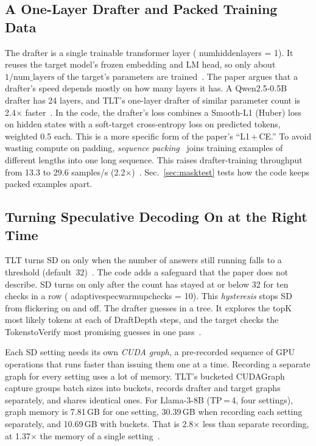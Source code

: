 \documentclass[conference]{IEEEtran}
\newcommand{\brkus}{\textunderscore\allowbreak}
\newcommand{\code}[1]{{\small\ttfamily\let\_\brkus\hyphenchar\font=-1 #1}}
\newcommand{\x}{\ensuremath{\times}}
\begin{document}
\subsection{A One-Layer Drafter and Packed Training Data}
The drafter is a single trainable transformer layer (\code{num\_hidden\_layers = 1}). It reuses the target model's frozen embedding and LM head, so only about $1/\text{num\_layers}$ of the target's parameters are trained~\cite[Sec.~4.1]{hu2026tlt}. The paper argues that a drafter's speed depends mostly on how many layers it has. A Qwen2.5-0.5B drafter has 24 layers, and TLT's one-layer drafter of similar parameter count is 2.4\x{} faster~\cite[Sec.~4.1]{hu2026tlt}. In the code, the drafter's loss combines a Smooth-L1 (Huber) loss on hidden states with a soft-target cross-entropy loss on predicted tokens, weighted 0.5 each. This is a more specific form of the paper's ``L1\,+\,CE.'' To avoid wasting compute on padding, \emph{sequence packing}~\cite{krell2021packing} joins training examples of different lengths into one long sequence. This raises drafter-training throughput from 13.3 to 29.6 samples/s (2.2\x)~\cite[Fig.~17b]{hu2026tlt}. Sec.~\ref{sec:masktest} tests how the code keeps packed examples apart.

\subsection{Turning Speculative Decoding On at the Right Time}
TLT turns SD on only when the number of answers still running falls to a threshold (default~32)~\cite[Sec.~5.1]{hu2026tlt}. The code adds a safeguard that the paper does not describe. SD turns on only after the count has stayed at or below 32 for ten checks in a row (\code{adaptive\_spec\_warmup\_checks = 10}). This \emph{hysteresis} stops SD from flickering on and off. The drafter guesses in a tree. It explores the \code{topK} most likely tokens at each of \code{Draft\_Depth} steps, and the target checks the \code{Tokens\_to\_Verify} most promising guesses in one pass~\cite[Sec.~5.1, Fig.~9]{hu2026tlt}.

Each SD setting needs its own \emph{CUDA graph}, a pre-recorded sequence of GPU operations that runs faster than issuing them one at a time. Recording a separate graph for every setting uses a lot of memory. TLT's bucketed CUDAGraph capture groups batch sizes into buckets, records drafter and target graphs separately, and shares identical ones. For Llama-3-8B (TP\,=\,4, four settings), graph memory is 7.81\,GB for one setting, 30.39\,GB when recording each setting separately, and 10.69\,GB with buckets. That is 2.8\x{} less than separate recording, at 1.37\x{} the memory of a single setting~\cite[Table~5]{hu2026tlt}.
\end{document}
